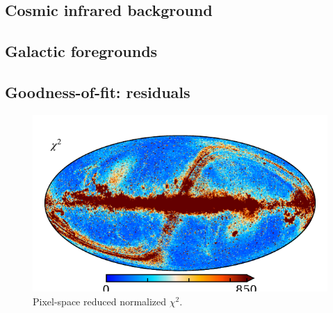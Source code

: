 \documentclass{aa}
\begin{document}
\subsection{Cosmic infrared background}
\subsection{Galactic foregrounds}
\subsection{Goodness-of-fit: residuals}

\begin{figure}
	\centering
	\includegraphics[width=\textwidth]{figs/chisq_c0001_k000019.pdf}
	\caption{Pixel-space reduced normalized $\chi^2$.}
	\label{fig:chisq}
\end{figure}
\end{document}
